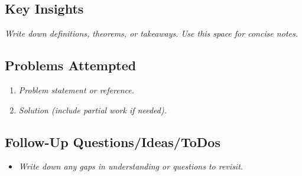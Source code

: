 \subsection*{Key Insights}
\textit{Write down definitions, theorems, or takeaways. Use this space for concise notes.}

\subsection*{Problems Attempted}
\begin{enumerate}
    \item \textit{Problem statement or reference.}
    \item \textit{Solution (include partial work if needed).}
\end{enumerate}

\subsection*{Follow-Up Questions/Ideas/ToDos}
\begin{itemize}
    \item \textit{Write down any gaps in understanding or questions to revisit.}
\end{itemize}
